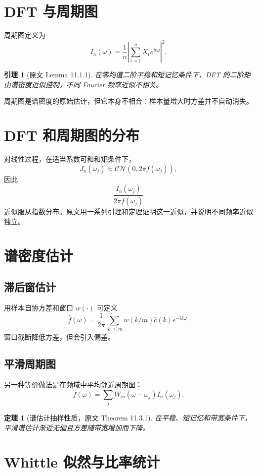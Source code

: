 \documentclass[11pt,a4paper,openany]{ctexbook}
\newtheorem{theorem}{定理}[section]
\newtheorem{lemma}{引理}[section]
\begin{document}
\section{DFT 与周期图}

周期图定义为
\[
  I_n(\omega)=\frac1n\left|\sum_{t=1}^n X_t e^{it\omega}\right|^2.
\]
\begin{lemma}[原文 Lemma 11.1.1]
在零均值二阶平稳和短记忆条件下，DFT 的二阶矩由谱密度近似控制，不同 Fourier 频率近似不相关。
\end{lemma}

周期图是谱密度的原始估计，但它本身不相合：样本量增大时方差并不自动消失。

\section{DFT 和周期图的分布}

对线性过程，在适当系数可和和矩条件下，
\[
  J_n(\omega_j)\approx \mathcal{CN}(0,2\pi f(\omega_j)),
\]
因此
\[
  \frac{I_n(\omega_j)}{2\pi f(\omega_j)}
\]
近似服从指数分布。原文用一系列引理和定理证明这一近似，并说明不同频率近似独立。

\section{谱密度估计}

\subsection{滞后窗估计}

用样本自协方差和窗口 \(w(\cdot)\) 可定义
\[
  \hat f(\omega)=\frac1{2\pi}\sum_{|k|\le m}w(k/m)\hat c(k)e^{-ik\omega}.
\]
窗口截断降低方差，但会引入偏差。

\subsection{平滑周期图}

另一种等价做法是在频域中平均邻近周期图：
\[
  \hat f(\omega)=\sum_j W_m(\omega-\omega_j)I_n(\omega_j).
\]
\begin{theorem}[谱估计抽样性质，原文 Theorem 11.3.1]
在平稳、短记忆和带宽条件下，平滑谱估计渐近无偏且方差随带宽增加而下降。
\end{theorem}

\section{Whittle 似然与比率统计}
\end{document}
